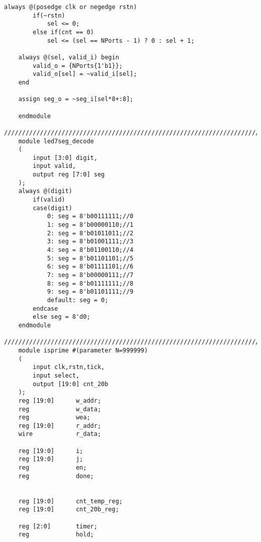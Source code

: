 \begin{lstlisting}[style=verilog]
	always @(posedge clk or negedge rstn) 
		if(~rstn)
			sel <= 0;
		else if(cnt == 0)
			sel <= (sel == NPorts - 1) ? 0 : sel + 1; 
	
	always @(sel, valid_i) begin 
		valid_o = {NPorts{1'b1}}; 
		valid_o[sel] = ~valid_i[sel]; 
	end
	
	assign seg_o = ~seg_i[sel*8+:8]; 
	
	endmodule
	/////////////////////////////////////////////////////////////////////////////////////
	module led7seg_decode
	(
		input [3:0] digit,
		input valid,
		output reg [7:0] seg
	);
	always @(digit)
		if(valid)
		case(digit)
			0: seg = 8'b00111111;//0
			1: seg = 8'b00000110;//1
			2: seg = 8'b01011011;//2
			3: seg = 8'b01001111;//3
			4: seg = 8'b01100110;//4
			5: seg = 8'b01101101;//5
			6: seg = 8'b01111101;//6
			7: seg = 8'b00000111;//7
			8: seg = 8'b01111111;//8
			9: seg = 8'b01101111;//9
			default: seg = 0;
		endcase
		else seg = 8'd0;
	endmodule
	/////////////////////////////////////////////////////////////////////////////////////
	module isprime #(parameter N=999999)
	(
		input clk,rstn,tick,
		input select,
		output [19:0] cnt_20b
	);
	reg [19:0]      w_addr;	       
	reg             w_data;	       
	reg             wea;	        
	reg [19:0]      r_addr;       
	wire            r_data;	        
	
	reg [19:0]      i;           
	reg [19:0]      j;         
	reg             en;
	reg             done;
	
	
	reg [19:0]      cnt_temp_reg;
	reg [19:0]      cnt_20b_reg;
	
	reg [2:0]       timer;
	reg             hold;
	

\end{lstlisting}
